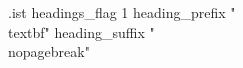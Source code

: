 \begin{filecontents*}{\jobname.ist}
  headings_flag 1
  heading_prefix "{\\textbf{"
  heading_suffix "}}\\nopagebreak\n"
\end{filecontents*}

\newcommand{\printindices}
{
  \printindex
  \printindex[region]
  \printindex[ingredient]
}